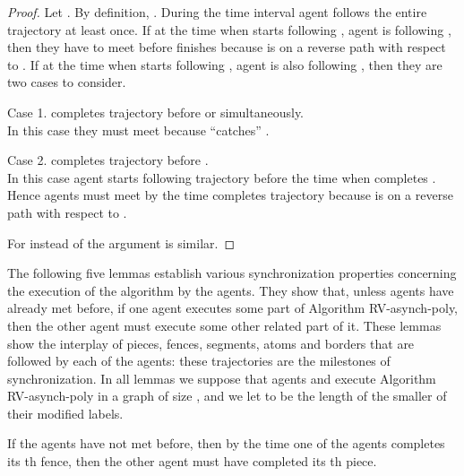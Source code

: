 \documentclass [11pt] {article}
\begin{document}
 \begin{proof}
 Let . By definition, . During the time interval  agent  follows the entire trajectory  at least once.
 If at the time when  starts following , agent  is following , then they have to meet before  finishes  because 
is on a reverse path with respect to . If at the time when  starts following , agent  is also following , then they are two cases to consider.

Case 1.  completes trajectory  before  or simultaneously.\\ In this case they must meet because  ``catches'' .

Case 2.   completes trajectory  before .\\ In this case agent  starts following trajectory  before  the time when  completes .
Hence agents must meet by the time  completes trajectory  because  is on a reverse path with respect to . 

For  instead of  the argument is similar.
 \end{proof}


The following five lemmas establish various synchronization properties concerning the execution of the algorithm by the agents. 
They show that, unless agents have already met before, if one agent executes some part of  
Algorithm RV-asynch-poly, then the other agent must execute some other related part of it. These lemmas show the interplay of pieces, fences, segments,
atoms and borders that are followed by each of the agents:
these trajectories are the milestones of synchronization. In all lemmas we
suppose that agents  and  execute Algorithm RV-asynch-poly in a graph of size , and we let  to be the length of the smaller of their modified labels.  

\begin{lemma}
\label{lem:1}
If the agents have not met before, then by the time one of the agents completes its  th fence, then the other agent must have completed its th piece.
\end{lemma}
\end{document}
